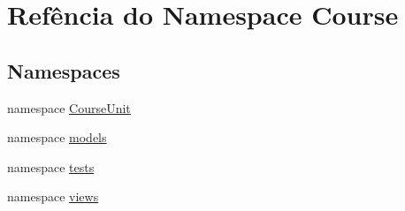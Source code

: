 \hypertarget{namespaceCourse}{\section{Refência do Namespace Course}
\label{dd/df0/namespaceCourse}
}
\subsection*{Namespaces}
\begin{DoxyCompactItemize}
\item 
namespace \hyperlink{namespaceCourse_1_1CourseUnit}{Course\-Unit}
\item 
namespace \hyperlink{namespaceCourse_1_1models}{models}
\item 
namespace \hyperlink{namespaceCourse_1_1tests}{tests}
\item 
namespace \hyperlink{namespaceCourse_1_1views}{views}
\end{DoxyCompactItemize}
